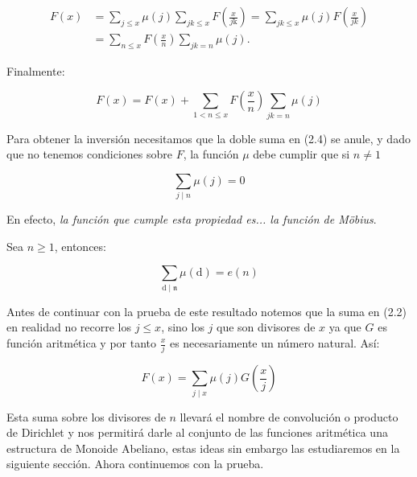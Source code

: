 \begin{align*}
    F(x)&=\sum_{j \leqslant x} \mu(j)\sum_{jk\leq x} F\left(\frac{x}{j \mathrm{k}}\right)=\sum_{jk\leq x}\mu(j)F \left( \frac{x}{jk} \right)\\
    &=\sum_{n\leq x}F \left( \frac{x}{n} \right)\sum_{jk=n}\mu(j)
.\end{align*}

Finalmente:

\begin{equation}
F(x)=F(x)+\sum_{1<n\leq x}F \left( \frac{x}{n} \right)\sum_{jk=n}\mu(j)
\end{equation}

Para obtener la inversión necesitamos que la doble suma en (2.4) se anule, y dado que no tenemos condiciones sobre $F$, la función $\mu$ debe cumplir que si $n \neq 1$

$$\sum_{j\mid n}\mu(j)=0$$

En efecto, \textit{la función que cumple esta propiedad es... la función de Möbius}.

\begin{theorem}
Sea $n \geqslant 1$, entonces:

$$\sum_{\mathrm{d} \mid \mathfrak{n}} \mu(\mathrm{d})=e(n)$$

\end{theorem}
Antes de continuar con la prueba de este resultado notemos que la suma en (2.2) en realidad no recorre los $j\leqslant x$, sino los $j$ que son divisores de $x$ ya que $G$ es función aritmética y por tanto $\frac{x}{j}$ es necesariamente un número natural. Así:

\begin{equation}
F(x)=\sum_{j \mid x} \mu(j) G\left(\frac{x}{j}\right)
\end{equation}

Esta suma sobre los divisores de $n$ llevará el nombre de convolución o producto de Dirichlet y nos permitirá darle al conjunto de las funciones aritmética una estructura de Monoide Abeliano, estas ideas sin embargo las estudiaremos en la  siguiente sección. Ahora continuemos con la prueba.\\

